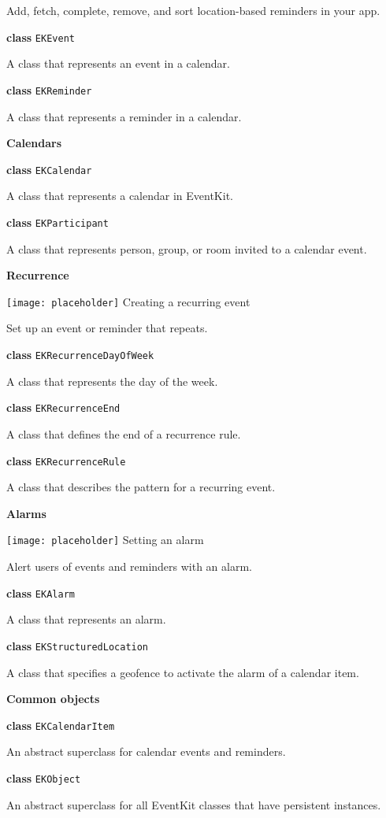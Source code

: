 \documentclass{article}
\begin{document}
Add, fetch, complete, remove, and sort location-based reminders in your app.

\textbf{class} \texttt{EKEvent}

A class that represents an event in a calendar.

\textbf{class} \texttt{EKReminder}

A class that represents a reminder in a calendar.

\textbf{Calendars}

\textbf{class} \texttt{EKCalendar}

A class that represents a calendar in EventKit.

\textbf{class} \texttt{EKParticipant}

A class that represents person, group, or room invited to a calendar event.

\textbf{Recurrence}

\texttt{[image: placeholder]} Creating a recurring event

Set up an event or reminder that repeats.

\textbf{class} \texttt{EKRecurrenceDayOfWeek}

A class that represents the day of the week.

\textbf{class} \texttt{EKRecurrenceEnd}

A class that defines the end of a recurrence rule.

\textbf{class} \texttt{EKRecurrenceRule}

A class that describes the pattern for a recurring event.

\textbf{Alarms}

\texttt{[image: placeholder]} Setting an alarm

Alert users of events and reminders with an alarm.

\textbf{class} \texttt{EKAlarm}

A class that represents an alarm.

\textbf{class} \texttt{EKStructuredLocation}

A class that specifies a geofence to activate the alarm of a calendar item.

\textbf{Common objects}

\textbf{class} \texttt{EKCalendarItem}

An abstract superclass for calendar events and reminders.

\textbf{class} \texttt{EKObject}

An abstract superclass for all EventKit classes that have persistent instances.
\end{document}
